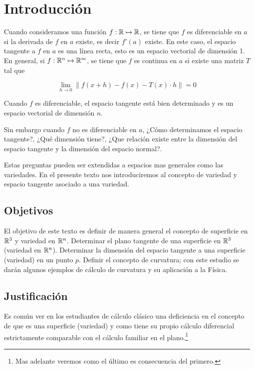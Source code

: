 \chapter{Introducción}\label{ch:introduccion}
Cuando consideramos una función $f:\mathbb{R}\mapsto\mathbb{R}$, se tiene que $f$ es diferenciable en $a$ si la derivada de $f$ en $a$ existe, es decir $f'(a)$ existe. En este caso, el espacio tangente a $f$ en $a$ es una línea recta, esto es un espacio vectorial de dimensión 1. En general, si $f:\mathbb{R}^{n}\mapsto\mathbb{R}^{m}$, se tiene que $f$ es continua en $a$ si existe una matriz $T$ tal que

    $$\lim_{h \to 0} \| f(x+h) - f(x) - T(x) \cdot h \| = 0$$

Cuando $f$ es diferenciable, el espacio tangente está bien determinado y es un espacio vectorial de dimensión $n$.

Sin embargo cuando $f$ no es diferenciable en $a$, ¿Cómo determinamos el espacio tangente?, ¿Qué dimensión tiene?, ¿Que relación existe entre la dimensión del espacio tangente y la dimensión del espacio normal?.

Estas preguntas pueden ser extendidas a espacios mas generales como las variedades.
En el presente texto nos introduciremos al concepto de variedad y espacio tangente asociado a una variedad.


\section{Objetivos}

El objetivo de este texto es definir de manera general el concepto de superficie en $\mathbb{R}^{3}$ y variedad en $\mathbb{R}^{n}$.
Determinar el plano tangente de una superficie en $\mathbb{R}^{3}$ (variedad en $\mathbb{R}^{n}$). Determinar la dimensión del espacio tangente a una superficie (variedad) en un punto $p$. Definir el concepto de curvatura; con este estudio se darán algunos ejemplos de cálculo de curvatura y su aplicación a la Física.

\section{Justificación}

Es común ver en los estudiantes de cálculo clásico una deficiencia en el concepto de que es una superficie (variedad) y como tiene su propio cálculo diferencial estrictamente comparable con el cálculo familiar en el plano.\footnote{Mas adelante veremos como el último es consecuencia del primero.}

